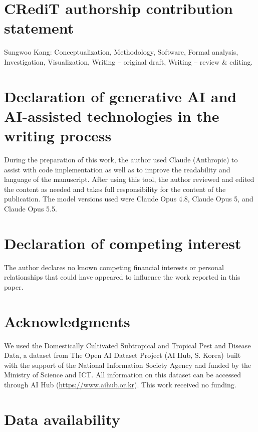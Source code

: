 \documentclass[preprint,12pt,authoryear,nopreprintline]{elsarticle}
\begin{document}
\section*{CRediT authorship contribution statement}

Sungwoo Kang: Conceptualization, Methodology, Software, Formal analysis,
Investigation, Visualization, Writing -- original draft, Writing -- review \&
editing.

\section*{Declaration of generative AI and AI-assisted technologies in the writing process}

During the preparation of this work, the author used Claude (Anthropic) to assist
with code implementation as well as to improve the readability and language of the
manuscript. After using this tool, the author reviewed and edited the content as
needed and takes full responsibility for the content of the publication. The model
versions used were Claude Opus 4.8, Claude Opus 5, and Claude Opus 5.5.

\section*{Declaration of competing interest}

The author declares no known competing financial interests or personal relationships
that could have appeared to influence the work reported in this paper.

\section*{Acknowledgments}

We used the Domestically Cultivated Subtropical and Tropical Pest and Disease Data, a
dataset from The Open AI Dataset Project (AI Hub, S. Korea) built with
the support of the National Information Society Agency and funded by the Ministry of
Science and ICT. All information on this dataset can be accessed through AI Hub
(\url{https://www.aihub.or.kr}). This work received no funding.

\section*{Data availability}
\label{sec:availability}
\end{document}
